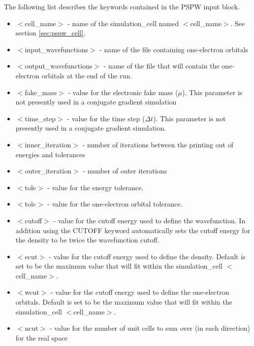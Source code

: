 The following list describes the keywords contained in the PSPW input block.
\begin{itemize}
        \item $<$cell\_name$>$ - name of
              the simulation\_cell named $<$cell\_name$>$.  See section \ref{sec:pspw_cell}.
        \item $<$input\_wavefunctions$>$ - name of the
              file containing one-electron orbitals
        \item $<$output\_wavefunctions$>$ - name of the
              file that will contain the one-electron orbitals at the
              end of the run. 
        \item $<$fake\_mass$>$ - value for the electronic
              fake mass ($\mu$). This parameter is not presently used in a 
              conjugate gradient simulation
        \item $<$time\_step$>$ - value for the time step ($\Delta t$).  This
              parameter is not presently used in a conjugate gradient simulation.
        \item $<$inner\_iteration$>$ - number of iterations between the 
              printing out of energies and tolerances
        \item $<$outer\_iteration$>$ - number of outer iterations
        \item $<$tole$>$ - value for the energy tolerance.
        \item $<$tolc$>$ - value for the one-electron orbital tolerance.
        \item $<$cutoff$>$ - value for the cutoff energy used to define the wavefunction.  In addition
                             using the CUTOFF keyword automatically sets the cutoff energy for the density
                             to be twice the wavefunction cutoff.
        \item $<$ecut$>$ - value for the cutoff energy used
                           to define the density. Default is set
                           to be the maximum value that will fit
                           within the simulation\_cell $<$cell\_name$>$.
        \item $<$wcut$>$ - value for the cutoff energy used
                           to define the one-electron orbitals.
                           Default is set to be the maximum value that 
                           will fit within the simulation\_cell $<$cell\_name$>$.
        \item $<$ncut$>$ - value for the number of unit cells
                          to sum over (in each direction) for the real space

\end{itemize}
